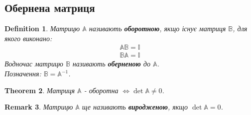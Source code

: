 \documentclass[a4paper, 10pt]{article}
\theoremstyle{theoremdd}
\newtheorem{theorem}{Theorem}[subsection]
\newtheorem{definition}[theorem]{Definition}
\newtheorem{remark}[theorem]{Remark}
\begin{document}
\subsection{Обернена матриця}
\begin{definition}
Матрицю $\mathbb{A}$ називають \textbf{оборотною}, якщо існує матриця $\mathbb{B}$, для якого виконано:
\begin{align*}
\mathbb{A} \mathbb{B} = \mathbb{I} \\
\mathbb{B} \mathbb{A} = \mathbb{I}
\end{align*}
Водночас матрицю $\mathbb{B}$ називають \textbf{оберненою} до $\mathbb{A}$.\\
Позначення: $\mathbb{B} = \mathbb{A}^{-1}$.
\end{definition}

\begin{theorem}
Матриця $\mathbb{A}$ - оборотна $\iff \det \mathbb{A} \neq 0$.
\end{theorem}

\begin{remark}
Матрицю $\mathbb{A}$ ще називають \textbf{виродженою}, якщо $\det \mathbb{A} = 0$.
\end{remark}
\end{document}
